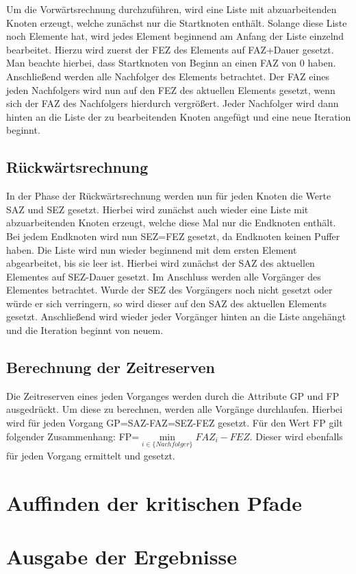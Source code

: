 Um die Vorw\"artsrechnung durchzuf\"uhren, wird eine Liste mit
abzuarbeitenden Knoten erzeugt, welche zun\"achst nur die Startknoten
enth\"alt. Solange diese Liste noch Elemente hat, wird jedes Element
beginnend am Anfang der Liste
einzelnd bearbeitet. Hierzu wird zuerst der FEZ des Elements auf
FAZ+Dauer gesetzt. Man beachte hierbei, dass Startknoten von Beginn an
einen FAZ von 0 haben. Anschlie{\ss}end werden alle Nachfolger
des Elements betrachtet. Der FAZ eines jeden Nachfolgers wird nun auf
den FEZ des aktuellen Elements gesetzt, wenn sich der FAZ des
Nachfolgers hierdurch vergr\"o{\ss}ert. Jeder Nachfolger wird dann hinten
an die Liste der zu bearbeitenden Knoten angef\"ugt und eine neue
Iteration beginnt.

\subsection{R\"uckw\"artsrechnung}

In der Phase der R\"uckw\"artsrechnung werden nun f\"ur jeden Knoten
die Werte SAZ und SEZ gesetzt. Hierbei wird zun\"achst auch wieder
eine Liste mit abzuarbeitenden Knoten erzeugt, welche diese Mal nur
die Endknoten enth\"alt. Bei jedem Endknoten wird nun SEZ=FEZ gesetzt,
da Endknoten keinen Puffer haben. Die Liste wird nun wieder beginnend
mit dem ersten Element abgearbeitet, bis sie leer ist. Hierbei wird
zun\"achst der SAZ des aktuellen Elementes auf SEZ-Dauer gesetzt. Im
Anschluss werden alle Vorg\"anger des Elementes betrachtet. Wurde der
SEZ des Vorg\"angers noch nicht gesetzt oder w\"urde er sich
verringern, so wird dieser auf den SAZ des aktuellen Elements
gesetzt. Anschlie{\ss}end wird wieder jeder Vorg\"anger hinten an die
Liste angeh\"angt und die Iteration beginnt von neuem.

\subsection{Berechnung der Zeitreserven}

Die Zeitreserven eines jeden Vorganges werden durch die Attribute GP
und FP ausgedr\"uckt. Um diese zu berechnen, werden alle Vorg\"ange
durchlaufen. Hierbei wird f\"ur jeden Vorgang GP=SAZ-FAZ=SEZ-FEZ
gesetzt. F\"ur den Wert FP gilt folgender Zusammenhang:
FP=\(\min\limits_{i \in \{Nachfolger\}} FAZ_i - FEZ\). Dieser wird
ebenfalls f\"ur jeden Vorgang ermittelt und gesetzt.

\section{Auffinden der kritischen Pfade}

\section{Ausgabe der Ergebnisse}
